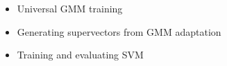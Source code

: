 \begin{itemize}
	\item Universal GMM training
	\item Generating supervectors from GMM adaptation
	\item Training and evaluating SVM
\end{itemize}